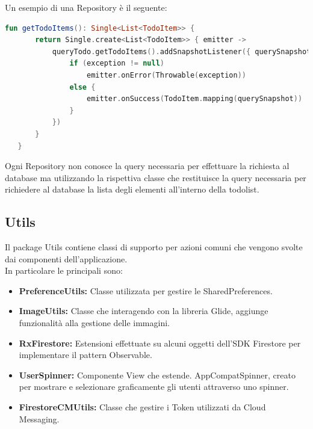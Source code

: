 Un esempio di una Repository è il seguente:

\begin{lstlisting}[language=kotlin,caption={Esempio RepositoryAggiunta elemento Todolist}]
fun getTodoItems(): Single<List<TodoItem>> {
       return Single.create<List<TodoItem>> { emitter ->
           queryTodo.getTodoItems().addSnapshotListener({ querySnapshot, exception ->
               if (exception != null)
                   emitter.onError(Throwable(exception))
               else {
                   emitter.onSuccess(TodoItem.mapping(querySnapshot))
               }
           })
       }
   }
\end{lstlisting}
Ogni Repository non conosce la query necessaria per effettuare la richiesta al database ma utilizzando la rispettiva classe che restituisce la query necessaria per richiedere al database la lista degli elementi all'interno della todolist.



\subsection{Utils}
Il package Utils contiene classi di supporto per azioni comuni che vengono svolte dai componenti dell'applicazione.\\
In particolare le principali sono:
\begin{itemize}
    \item \textbf{PreferenceUtils:} Classe utilizzata per gestire le SharedPreferences.
    \item \textbf{ImageUtils:} Classe che interagendo con la libreria Glide, aggiunge funzionalità alla gestione delle immagini.
    \item \textbf{RxFirestore:} Estensioni effettuate su alcuni oggetti dell'SDK Firestore per implementare il pattern Observable.
    \item \textbf{UserSpinner:} Componente View che estende. AppCompatSpinner, creato per mostrare e selezionare graficamente gli utenti attraverso uno spinner.
    \item \textbf{FirestoreCMUtils:} Classe che gestire i Token utilizzati da Cloud Messaging.
\end{itemize}

